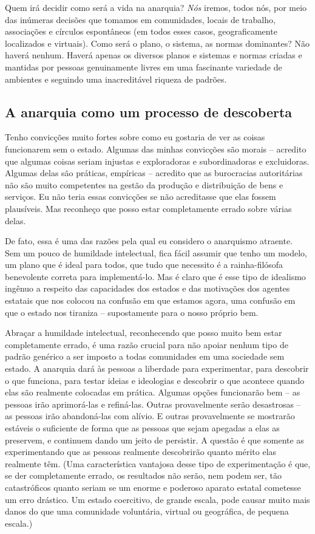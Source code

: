 Quem irá decidir como será a vida na anarquia? \emph{Nós} iremos, todos nós, por meio das inúmeras decisões que tomamos em comunidades, locais de trabalho, associações e círculos espontâneos (em todos esses casos, geograficamente localizados e virtuais). Como será o plano, o sistema, as normas dominantes? Não haverá nenhum. Haverá apenas os diversos planos e sistemas e normas criadas e mantidas por pessoas genuinamente livres em uma fascinante variedade de ambientes e seguindo uma inacreditável riqueza de padrões.

\subsection*{A anarquia como um processo de descoberta}

Tenho convicções muito fortes sobre como eu gostaria de ver as coisas funcionarem sem o estado. Algumas das minhas convicções são morais -- acredito que algumas coisas seriam injustas e exploradoras e subordinadoras e excluidoras. Algumas delas são práticas, empíricas -- acredito que as burocracias autoritárias não são muito competentes na gestão da produção e distribuição de bens e serviços. Eu não teria essas convicções se não acreditasse que elas fossem plausíveis. Mas reconheço que posso estar completamente errado sobre várias delas.

De fato, essa é uma das razões pela qual eu considero o anarquismo atraente. Sem um pouco de humildade intelectual, fica fácil assumir que tenho um modelo, um plano que é ideal para todos, que tudo que necessito é a rainha-filósofa benevolente correta para implementá-lo. Mas é claro que é esse tipo de idealismo ingênuo a respeito das capacidades dos estados e das motivações dos agentes estatais que nos colocou na confusão em que estamos agora, uma confusão em que o estado nos tiraniza -- supostamente para o nosso próprio bem.

Abraçar a humildade intelectual, reconhecendo que posso muito bem estar completamente errado, é uma razão crucial para não apoiar nenhum tipo de padrão genérico a ser imposto a todas comunidades em uma sociedade sem estado. A anarquia dará às pessoas a liberdade para experimentar, para descobrir o que funciona, para testar ideias e ideologias e descobrir o que acontece quando elas são realmente colocadas em prática. Algumas opções funcionarão bem -- as pessoas irão aprimorá-las e refiná-las. Outras provavelmente serão desastrosas -- as pessoas irão abandoná-las com alívio. E outras provavelmente se mostrarão estáveis o suficiente de forma que as pessoas que sejam apegadas a elas as preservem, e continuem dando um jeito de persistir. A questão é que somente as experimentando que as pessoas realmente descobrirão quanto mérito elas realmente têm. (Uma característica vantajosa desse tipo de experimentação é que, se der completamente errado, os resultados não serão, nem podem ser, tão catastróficos quanto seriam se um enorme e poderoso aparato estatal cometesse um erro drástico. Um estado coercitivo, de grande escala, pode causar muito mais danos do que uma comunidade voluntária, virtual ou geográfica, de pequena escala.)

